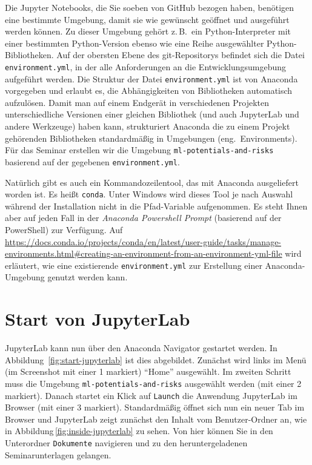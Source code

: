 \documentclass[nobib]{tufte-handout}
\begin{document}
Die Jupyter Notebooks, die Sie soeben von GitHub bezogen haben, benötigen eine bestimmte Umgebung, damit sie wie gewünscht geöffnet und ausgeführt werden können.
Zu dieser Umgebung gehört z.\,B.\ ein Python-Interpreter mit einer bestimmten Python-Version ebenso wie eine Reihe ausgewählter Python-Bibliotheken.
Auf der obersten Ebene des git-Repositorys befindet sich die Datei \texttt{environment.yml}, in der alle Anforderungen an die Entwicklungsumgebung aufgeführt werden.
Die Struktur der Datei \texttt{environment.yml} ist von Anaconda vorgegeben und erlaubt es, die Abhängigkeiten von Bibliotheken automatisch aufzulösen.
Damit man auf einem Endgerät in verschiedenen Projekten unterschiedliche Versionen einer gleichen Bibliothek (und auch JupyterLab und andere Werkzeuge) haben kann,
strukturiert Anaconda die zu einem Projekt gehörenden Bibliotheken standardmäßig in Umgebungen (eng.\ Environments).
Für das Seminar erstellen wir die Umgebung
\texttt{ml-potentials-and-risks}
basierend auf der gegebenen \texttt{environment.yml}.

Natürlich gibt es auch ein Kommandozeilentool, das mit Anaconda ausgeliefert worden ist.
Es heißt \texttt{conda}.
Unter Windows wird dieses Tool je nach Auswahl während der Installation nicht in die Pfad-Variable aufgenommen.
Es steht Ihnen aber auf jeden Fall in der
\emph{Anaconda Powershell Prompt} (basierend auf der PowerShell)
zur Verfügung.
Auf
\url{https://docs.conda.io/projects/conda/en/latest/user-guide/tasks/manage-environments.html#creating-an-environment-from-an-environment-yml-file}
wird erläutert, wie eine existierende \texttt{environment.yml} zur Erstellung einer Anaconda-Umgebung genutzt werden kann.

\section{Start von JupyterLab}

JupyterLab kann nun über den Anaconda Navigator gestartet werden.
In Abbildung~\ref{fig:start-jupyterlab} ist dies abgebildet.
Zunächst wird links im Menü
(im Screenshot mit einer 1 markiert)
\enquote{Home} ausgewählt.
Im zweiten Schritt muss die Umgebung
\texttt{ml-potentials-and-risks}
ausgewählt werden
(mit einer 2 markiert).
Danach startet ein Klick auf \texttt{Launch} die Anwendung JupyterLab im Browser
(mit einer 3 markiert).
Standardmäßig öffnet sich nun ein neuer Tab im Browser und JupyterLab zeigt zunächst den Inhalt vom Benutzer-Ordner an, wie in
Abbildung\,\ref{fig:inside-jupyterlab} zu sehen.
Von hier können Sie in den Unterordner \texttt{Dokumente} navigieren und zu den heruntergeladenen Seminarunterlagen gelangen.
\end{document}
